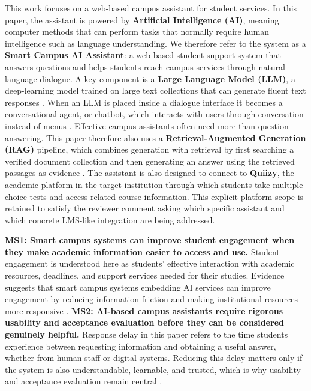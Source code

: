 \documentclass[a4paper,9pt,twocolumn]{extarticle}
\begin{document}
This work focuses on a web-based campus assistant for student services.
In this paper, the assistant is powered by \textbf{Artificial Intelligence
(AI)}, meaning computer methods that can perform tasks that normally
require human intelligence such as language understanding. We therefore
refer to the system as a \textbf{Smart Campus AI Assistant}: a web-based
student support system that answers questions and helps students reach
campus services through natural-language dialogue. A key component is a
\textbf{Large Language Model (LLM)}, a deep-learning model trained on large
text collections that can generate fluent text responses
\cite{zhao2023survey,brown2020language}. When an LLM is placed inside a
dialogue interface it becomes a conversational agent, or chatbot, which
interacts with users through conversation instead of menus
\cite{labadze2023,pereira2023}. Effective campus assistants often need
more than question-answering. This paper therefore also uses a
\textbf{Retrieval-Augmented Generation (RAG)} pipeline, which combines
generation with retrieval by first searching a verified document
collection and then generating an answer using the retrieved passages as
evidence \cite{lewis2020retrieval,gao2023retrieval}. The assistant is
also designed to connect to \textbf{Quiizy}, the academic platform in the
target institution through which students take multiple-choice tests and
access related course information. This explicit platform scope is
retained to satisfy the reviewer comment asking which specific assistant
and which concrete LMS-like integration are being addressed.

\textbf{MS1: Smart campus systems can improve student engagement when they
make academic information easier to access and use.} Student engagement
is understood here as students' effective interaction with academic
resources, deadlines, and support services needed for their studies.
Evidence suggests that smart campus systems embedding AI services can
improve engagement by reducing information friction and making
institutional resources more responsive \cite{chen2024}. \textbf{MS2:
AI-based campus assistants require rigorous usability and acceptance
evaluation before they can be considered genuinely helpful.} Response
delay in this paper refers to the time students experience between
requesting information and obtaining a useful answer, whether from human
staff or digital systems. Reducing this delay matters only if the
system is also understandable, learnable, and trusted, which is why
usability and acceptance evaluation remain central
\cite{hollingsed2007,mahatody2010,davis1989}.
\end{document}
